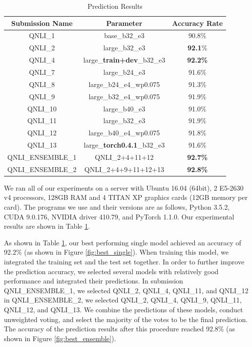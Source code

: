 \documentclass[10pt,journal,compsoc]{IEEEtran}
\begin{document}
\begin{table}[!bp]
  \centering
  \caption{Prediction Results} 
  \label{tab:prediction_results}
  \begin{tabular}{c|c|c}
  \toprule
  Submission Name & Parameter & Accuracy Rate\\
  \midrule
  QNLI\_1 & base\_b32\_e3 & 90.8\%\\
  QNLI\_2 & large\_b32\_e3 & \textbf{92.1}\%\\
  QNLI\_4 & large\_\textbf{train+dev}\_b32\_e3 & \textbf{92.2\%}\\
  QNLI\_7 & large\_b24\_e3 & 91.6\%\\
  QNLI\_8 & large\_b24\_e4\_wp0.075 & 91.3\%\\
  QNLI\_9 & large\_b32\_e4\_wp0.075 & 91.9\%\\
  QNLI\_10 & large\_b40\_e3 & 91.0\%\\
  QNLI\_11 & large\_b32\_e3 & 91.9\%\\
  QNLI\_12 & large\_b40\_e4\_wp0.075 & 91.8\%\\
  QNLI\_13 & large\_\textbf{torch0.4.1}\_b32\_e3 & 91.6\%\\
  QNLI\_ENSEMBLE\_1 & QNLI\_2+4+11+12 & \textbf{92.7\%}\\
  QNLI\_ENSEMBLE\_2 & QNLI\_2+4+9+11+12+13 & \textbf{92.8\%}\\
  \bottomrule
  \end{tabular}
\end{table}

We ran all of our experiments on a server with Ubuntu 16.04 (64bit), 2 E5-2630 v4 processors, 128GB RAM and 4 TITAN XP graphics cards (12GB memory per card). The programs we use and their versions are as follows, Python 3.5.2, CUDA 9.0.176, NVIDIA driver 410.79, and PyTorch 1.1.0. Our experimental results are shown in Table \ref{tab:prediction_results}.

As shown in Table \ref{tab:prediction_results}, our best performing single model achieved an accuracy of 92.2\% (as shown in Figure \ref{fig:best_single}). When training this model, we integrated the training set and the test set together. In order to further improve the prediction accuracy, we selected several models with relatively good performance and integrated their predictions. In submission QNLI\_ENSEMBLE\_1, we selected QNLI\_2, QNLI\_4, QNLI\_11, and QNLI\_12 in QNLI\_ENSEMBLE\_2, we selected QNLI\_2, QNLI\_4, QNLI\_9, QNLI\_11, QNLI\_12, and QNLI\_13. We combine the predictions of these models, conduct unweighted voting, and select the majority of the votes to be the final prediction. The accuracy of the prediction results after this procedure reached 92.8\% (as shown in Figure \ref{fig:best_ensemble}).
\end{document}

